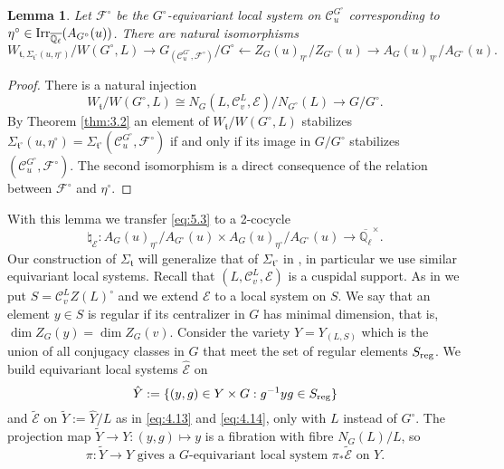 \documentclass[11pt]{amsart}
\newtheorem{lem}[thm]{Lemma}
\theoremstyle{definition}
\newcommand{\Q}{\mathbb Q}
\def\Irr{{\rm Irr}}
\def\cC{{\mathcal C}}
\def\cE{{\mathcal E}}
\def\cF{{\mathcal F}}
\def\reg{{\rm reg}}
\def\ft{{\mathfrak t}}
\begin{document}
\begin{lem}\label{lem:5.2}
Let $\cF^\circ$ be the $G^\circ$-equivariant local system on $\cC_u^{G^\circ}$ 
corresponding to $\eta^\circ \in \Irr_{\overline{\Q_{\ell}}}(A_{G^\circ}(u))$.
There are natural isomorphisms 
\[
W_{\ft,\Sigma_{\ft^\circ}(u,\eta^\circ)} / W(G^\circ,L) \to 
G_{(\cC_u^{G^\circ},\cF^\circ)} / G^\circ \leftarrow 
Z_G (u)_{\eta^\circ} / Z_{G^\circ}(u) \to A_G (u)_{\eta^\circ} / A_{G^\circ}(u) .
\]
\end{lem}
\begin{proof}
There is a natural injection 
\begin{equation}\label{eq:5.4}
W_\ft / W(G^\circ,L) \cong N_G (L,\cC_v^L,\cE) / N_{G^\circ}(L) \to G / G^\circ .
\end{equation}
By Theorem \ref{thm:3.2} an element of $W_\ft / W(G^\circ,L)$ stabilizes 
$\Sigma_{\ft^\circ}(u,\eta^\circ) = \Sigma_{\ft^\circ} (\cC_u^{G^\circ},\cF^\circ)$ 
if and only if its image in 
$G / G^\circ$ stabilizes $(\cC_u^{G^\circ},\cF^\circ)$. The second isomorphism is 
a direct consequence of the relation between $\cF^\circ$ and $\eta^\circ$.
\end{proof}
With this lemma we transfer \eqref{eq:5.3} to a 2-cocycle
\begin{equation}\label{eq:5.8}
\natural_\cE : A_G (u)_{\eta^\circ} / A_{G^\circ}(u) \times
A_G (u)_{\eta^\circ} / A_{G^\circ}(u) \to \overline{\Q_{\ell}}^\times.
\end{equation}
Our construction of $\Sigma_\ft$ will generalize that of $\Sigma_{\ft^\circ}$ in
\cite{Lus1}, in particular we use similar equivariant local systems. 
Recall that $(L,\cC_v^L,\cE)$ is a cuspidal support. As in \cite[\S 3.1]{Lus1}
we put $S = \cC_v^L Z(L)^\circ$ and we extend $\cE$ to  a local system on $S$.
We say that an element $y \in S$ is regular if its centralizer in $G$ has minimal
dimension, that is, $\dim Z_G (y) = \dim Z_G (v)$.
Consider the variety $Y = Y_{(L,S)}$ which is the union of all conjugacy classes
in $G$ that meet the set of regular elements $S_\reg$. We build equivariant local 
systems $\hat \cE$ on 
\[
\hat Y := \{ (y,g) \in Y \times G : g^{-1} y g \in S_\reg \}
\]
and $\tilde \cE$ on $\tilde Y := \hat Y / L$ as in 
\eqref{eq:4.13} and \eqref{eq:4.14}, only with $L$ instead of $G^\circ$. 
The projection map $\tilde Y \to Y : (y,g) \mapsto y$ is a fibration with fibre 
$N_G (L) / L$, so
\begin{equation}\label{eq:5.20}
\pi : \tilde Y \to Y \text{ gives a $G$-equivariant local system }
\pi_* \tilde{\cE} \text{ on } Y .
\end{equation}
\end{document}
